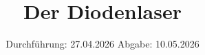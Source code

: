 


\subject{V60}
\title{Der Diodenlaser}
\date{%
  Durchführung: 27.04.2026
  \hspace{3em}
  Abgabe: 10.05.2026
}



\maketitle
\thispagestyle{empty}
\tableofcontents
\newpage







\newpage
\printbibliography{}




